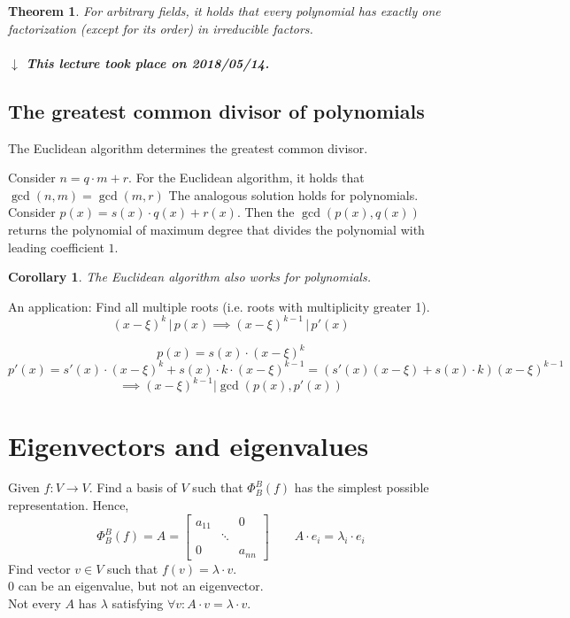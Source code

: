 \documentclass[a4paper]{article}
\newcounter{lecref}[section]
\numberwithin{lecref}{section}
\newtheorem{theorem}[lecref]{Theorem}
\newtheorem{corollary}[lecref]{Corollary}
\newcommand{\dateref}[1]{%
  \begin{mdframed}[backgroundcolor=gray!10,innerbottommargin=0pt,innertopmargin=0pt]
    \paragraph{\textit{$\downarrow$ This lecture took place on #1.}}%
  \end{mdframed}%
}
\newcommand{\divides}{\,\big|\,} %
\begin{document}
\begin{theorem} %
  For arbitrary fields, it holds that
  every polynomial has exactly one factorization (except for its order) in irreducible factors.
\end{theorem}

\dateref{2018/05/14}

\subsection{The greatest common divisor of polynomials}

The Euclidean algorithm determines the greatest common divisor.

Consider $n = q \cdot m + r$. For the Euclidean algorithm, it holds that $\operatorname{gcd}(n, m) = \operatorname{gcd}(m, r)$
The analogous solution holds for polynomials. Consider $p(x) = s(x) \cdot q(x) + r(x)$.
Then the $\operatorname{gcd}(p(x), q(x))$ returns the polynomial of maximum degree that divides the polynomial with leading coefficient $1$.

\begin{corollary}
  The Euclidean algorithm also works for polynomials.
\end{corollary}

An application: Find all multiple roots (i.e. roots with multiplicity greater 1).
\[ (x - \xi)^k \divides{} p(x) \implies (x - \xi)^{k-1} \divides{} p'(x) \]

\[ p(x) = s(x) \cdot (x - \xi)^k \]
\[ p'(x) = s'(x) \cdot (x - \xi)^k + s(x) \cdot k \cdot (x - \xi)^{k-1} = (s'(x) (x - \xi) + s(x) \cdot k) (x - \xi)^{k-1} \]
\[ \implies (x - \xi)^{k-1} | \operatorname{gcd}(p(x), p'(x)) \]

\section{Eigenvectors and eigenvalues} %

Given $f: V \to V$. Find a basis of $V$ such that $\Phi_B^B(f)$ has the simplest possible representation.
Hence,
\[ \Phi_B^B(f) = A = \begin{bmatrix} a_{11} &  & 0 \\ & \ddots & \\ 0 &  & a_{nn} \end{bmatrix} \qquad A \cdot e_i = \lambda_i \cdot e_i \]
Find vector $v \in V$ such that $f(v) = \lambda \cdot v$. \\
$0$ can be an eigenvalue, but not an eigenvector. \\
Not every $A$ has $\lambda$ satisfying $\forall v: A \cdot v = \lambda \cdot v$.
\end{document}
